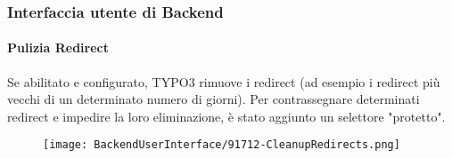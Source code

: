 %

\begin{frame}[fragile]
	\frametitle{Interfaccia utente di Backend}
	\framesubtitle{Pulizia Redirect}

    Se abilitato e configurato, TYPO3 rimuove i redirect (ad esempio i redirect
    più vecchi di un determinato numero di giorni).
    Per contrassegnare determinati redirect e impedire la loro eliminazione,
    è stato aggiunto un selettore "protetto".

	\begin{figure}
		\texttt{[image: BackendUserInterface/91712-CleanupRedirects.png]}
	\end{figure}

\end{frame}

